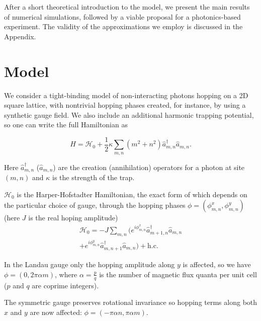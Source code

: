 \documentclass[twocolumn, 10pt, aps, superscriptaddress, floatfix, showpacs, pra, citeautoscript]{revtex4-1}
\newcommand{\co}[2]{#2}
\renewcommand{\paragraph}{\co}
\begin{document}
\paragraph{Summary of the manuscript}
After a short theoretical introduction to the model, we present the
main results of numerical simulations, followed by a viable proposal
for a photonics-based experiment. The validity of the approximations
we employ is discussed in the Appendix.

\section{Model}
\label{sec:model}

We consider a tight-binding model of non-interacting photons hopping
on a 2D square lattice, with nontrivial hopping phases created, for
instance, by using a synthetic gauge field. We also include an
additional harmonic trapping potential, so one can write the full Hamiltonian as

\begin{equation}\label{eq:model}
H=\mathcal{H}_0+\frac{1}{2}\kappa
\sum_{m,n}(m^{2}+n^{2})\hat{a}_{m,n}^{\dagger}\hat{a}_{m,n}.
\end{equation}

Here $\hat{a}_{m,n}^{\dagger}$ ($\hat{a}_{m,n}$) are the creation
(annihilation) operators for a photon at site $(m,n)$ and $\kappa$ is the
strength of the trap.

$\mathcal{H}_0$ is the Harper-Hofstadter Hamiltonian, the exact form
of which depends on the particular choice of gauge, through the
hopping phases $\phi = (\phi_{m,n}^x, \phi_{m,n}^y)$ (here $J$ is the real hoping
amplitude)
%
\begin{multline}\label{eq:hh_hamiltonian}
\mathcal{H}_0=-J\sum_{m,n}(e^{i \phi_{m,n}^x}\hat{a}_{m+1,n}^{\dagger}\hat{a}_{m,n}\\
+e^{i \phi_{m,n}^y}\hat{a}_{m,n+1}^{\dagger}\hat{a}_{m,n}) + \text{h.c.}
\end{multline}


In the Landau gauge only the hopping amplitude along $y$ is affected,
so we have $\phi = (0, 2\pi\alpha m)$, where $\alpha = \frac{p}{q}$ is
the number of magnetic flux quanta per unit cell ($p$ and $q$ are
coprime integers).

The symmetric gauge preserves rotational invariance so hopping terms
along both $x$ and $y$ are now affected: $\phi = (-\pi\alpha n,  \pi\alpha m)$.
\end{document}
